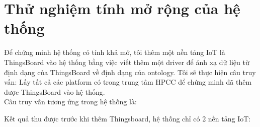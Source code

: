 \section{Thử nghiệm tính mở rộng của hệ thống}
Để chứng minh hệ thống có tính khả mở, tôi thêm một nền tảng IoT là ThingsBoard vào hệ thống bằng việc viết thêm một driver để ánh xạ dữ liệu từ định dạng của ThingsBoard về định dạng của ontology. Tôi sẽ thực hiện câu truy vấn: Lấy tất cả các platform có trong trung tâm HPCC để chứng minh đã thêm được ThingsBoard vào hệ thống. \\
Câu truy vấn tương ứng trong hệ thống là:

\clearpage
Kết quả thu được trước khi thêm Thingsboard, hệ thống chỉ có 2 nền tảng IoT: \\

